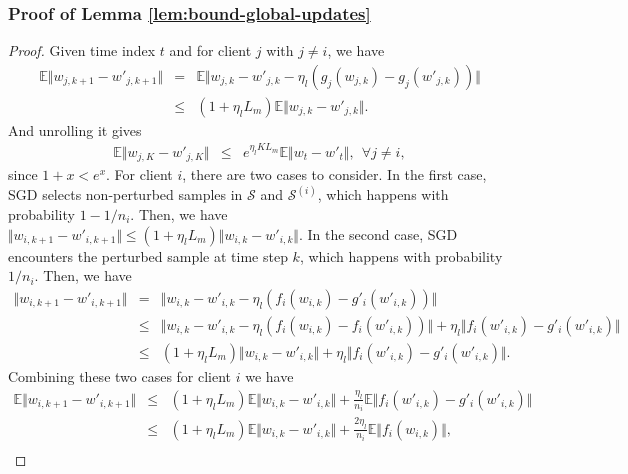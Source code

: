 \subsubsection{Proof of Lemma \ref{lem:bound-global-updates}}
\begin{proof}
    Given time index $t$ and for client $j$ with $j \ne i$, we have
    \begin{eqnarray}
        \mathbb{E}\Vert w_{j,k+1} - w'_{j,k+1}\Vert &=& \mathbb{E}\Vert w_{j,k} - w'_{j,k} - \eta_l(g_j(w_{j,k}) - g_j(w'_{j,k})) \Vert   \nonumber   \\
        &\le& (1 + \eta_l L_m )\mathbb{E}\Vert w_{j,k} - w'_{j,k} \Vert .   \nonumber
    \end{eqnarray}
    And unrolling it gives
    \begin{eqnarray}    \label{eq:jnoti}
        \mathbb{E}\Vert w_{j,K} - w'_{j,K} \Vert &\le& e^{\eta_l KL_m}\mathbb{E}\Vert w_t - w'_t\Vert , ~~ \forall j \ne i, \nonumber
    \end{eqnarray}
    since $1+x<e^x$.
    For client $i$, there are two cases to consider. In the first case, SGD selects non-perturbed samples in $\mathcal{S}$ and $\mathcal{S}^{(i)}$, which happens with probability $1 - 1/n_i$. Then, we have
    $
        \Vert w_{i,k+1} - w'_{i,k+1} \Vert \le (1 + \eta_l L_m ) \Vert w_{i,k} - w'_{i,k} \Vert.
    $
    In the second case, SGD encounters the perturbed sample at time step $k$, which happens with probability $1/n_i$. Then, we have
    \begin{eqnarray}
        \Vert w_{i,k+1} - w'_{i,k+1} \Vert &=& \Vert w_{i,k} - w'_{i,k} - \eta_l(f_i(w_{i,k}) - g'_i(w'_{i,k})) \Vert   \nonumber   \\
        &\le& \Vert w_{i,k} - w'_{i,k} - \eta_l(f_i(w_{i,k}) - f_i(w'_{i,k})) \Vert + \eta_l\Vert f_i(w'_{i,k}) - g'_i(w'_{i,k}) \Vert    \nonumber   \\
        &\le& (1 + \eta_l L_m )\Vert w_{i,k} - w'_{i,k} \Vert + \eta_l\Vert f_i(w'_{i,k}) - g'_i(w'_{i,k}) \Vert .  \nonumber
    \end{eqnarray}
    Combining these two cases for client $i$ we have
    \begin{eqnarray}
        \mathbb{E}\Vert w_{i,k+1} - w'_{i,k+1} \Vert &\le& (1 + \eta_l L_m )\mathbb{E}\Vert w_{i,k} - w'_{i,k} \Vert + \frac{\eta_l}{n_i}\mathbb{E}\Vert f_i(w'_{i,k}) - g'_i(w'_{i,k}) \Vert    \nonumber   \\
        &\le& (1 + \eta_l L_m )\mathbb{E}\Vert w_{i,k} - w'_{i,k} \Vert + \frac{2\eta_l}{n_i}\mathbb{E}\Vert f_i(w_{i,k}) \Vert,  \nonumber  \\

\end{eqnarray}
\end{proof}

